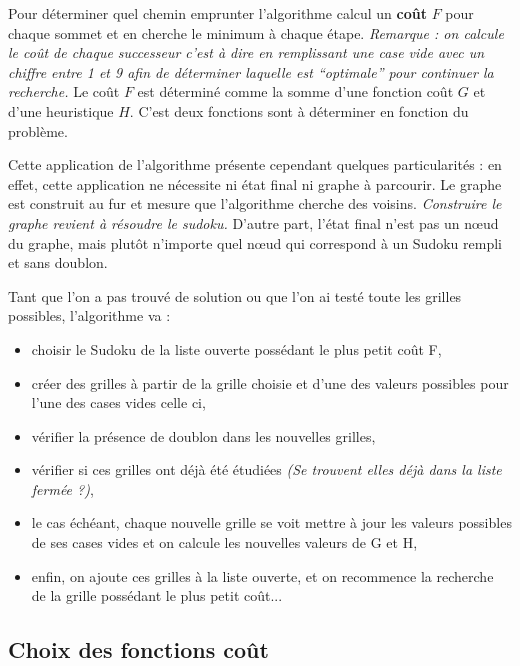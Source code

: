             Pour déterminer quel chemin emprunter l'algorithme calcul un \textbf{coût} $F$ pour chaque sommet et en cherche le minimum à chaque étape. \textit{Remarque : on calcule le coût de chaque successeur c'est à dire en remplissant une case vide avec un chiffre entre 1 et 9 afin de déterminer laquelle est ``optimale'' pour continuer la recherche.} Le coût $F$ est déterminé comme la somme d'une fonction coût $G$ et d'une heuristique $H$. C'est deux fonctions sont à déterminer en fonction du problème.
            \bigskip
            
            Cette application de l'algorithme présente cependant quelques particularités : en effet, cette application ne nécessite ni état final ni graphe à parcourir. Le graphe est construit au fur et mesure que l'algorithme cherche des voisins. \textit{Construire le graphe revient à résoudre le sudoku.} D'autre part, l'état final n'est pas un nœud du graphe, mais plutôt n'importe quel nœud qui correspond à un Sudoku rempli et sans doublon.
            
            
              Tant que l'on a pas trouvé de solution ou que l'on ai testé toute les grilles possibles, l'algorithme va :
            \begin{itemize}
            	  \item choisir le Sudoku de la liste ouverte possédant le plus petit coût F,
               \item créer des grilles à partir de la grille choisie et d'une des valeurs possibles pour l'une des cases vides celle ci,
                \item vérifier la présence de doublon dans les nouvelles grilles,
                \item vérifier si ces grilles ont déjà été étudiées \textit{(Se trouvent elles déjà dans la liste fermée ?)},
                \item le cas échéant, chaque nouvelle grille se voit mettre à jour les valeurs possibles de ses cases vides et on calcule les nouvelles valeurs de G et H,
                \item enfin, on ajoute ces grilles à la liste ouverte, et on recommence la recherche de la grille possédant le plus petit coût...   
            \end{itemize}
        \subsection{Choix des fonctions coût}
        
